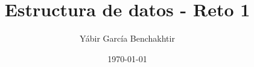 \documentclass{article}
\begin{document}
\title{Estructura de datos - Reto 1}
\author{Yábir García Benchakhtir}
\date{\today}
\maketitle




\end{document}
